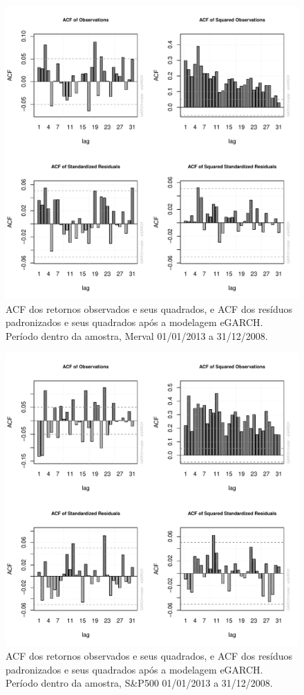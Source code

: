 \documentclass[review]{elsarticle}
\theoremstyle{definition}
\begin{document}
\begin{figure}[H]
	\centering
	\includegraphics[width=0.9\linewidth]{figs/artigo-acf-Merval}
	\caption{ACF dos retornos observados e seus quadrados, e ACF dos resíduos padronizados e seus quadrados após a modelagem eGARCH. Período dentro da amostra, Merval 01/01/2013 a 31/12/2008.}
	\label{fig:artigo-acf-merval}
\end{figure}

\begin{figure}[H]
	\centering
	\includegraphics[width=0.9\linewidth]{figs/artigo-acf-SP500}
	\caption{ACF dos retornos observados e seus quadrados, e ACF dos resíduos padronizados e seus quadrados após a modelagem eGARCH. Período dentro da amostra, S\&P500 01/01/2013 a 31/12/2008.}
	\label{fig:artigo-acf-sp500}
\end{figure}
\end{document}
